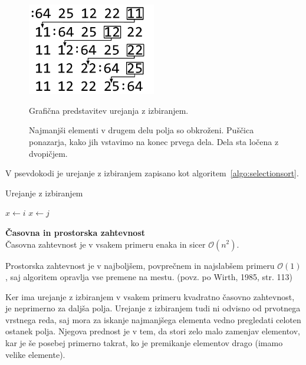 \documentclass[a4paper,oneside,12pt]{article}
\newcommand{\subsubsubsection}[1]{\vspace*{1ex}\textbf{#1}\\}
\begin{document}
\begin{figure}[ht]
    \begin{center}
        \includegraphics[height=40mm]{slike/selectionsort.pdf}
    \end{center}
    \vspace{-0.7cm}
    \caption[Urejanje z izbiranjem]{Grafična predstavitev urejanja z izbiranjem.}
    \caption*{{\small Najmanjši elementi v drugem delu polja so obkroženi. Puščica ponazarja, kako jih
    vstavimo na konec prvega dela. Dela sta ločena z dvopičjem.}}
    \label{fig:selectionsortimage}
\end{figure}

V psevdokodi je urejanje z izbiranjem zapisano kot algoritem~\ref{algo:selectionsort}.

\begin{algorithm}[h!t!]
  \caption{Urejanje z izbiranjem}\label{algo:selectionsort}
  \begin{algorithmic}[1]
            \State $x \gets i$
                    \State $x \gets j$
                \EndIf
            \EndFor
        \EndFor
    \EndFunction
  \end{algorithmic}
\end{algorithm}

\subsubsubsection{Časovna in prostorska zahtevnost} \nopagebreak
Časovna zahtevnost je v vsakem primeru enaka in sicer $\mathcal{O}(n^2)$.

Prostorska zahtevnost je v najboljšem, povprečnem in najslabšem primeru $\mathcal{O}(1)$, 
saj algoritem opravlja vse premene na mestu.
(povz. po Wirth, 1985, str. 113) 

Ker ima urejanje z izbiranjem v vsakem primeru kvadratno časovno zahtevnost, je neprimerno
za daljša polja. Urejanje z izbiranjem tudi ni odvisno od prvotnega vrstnega reda,
saj mora za iskanje najmanjšega elementa vedno pregledati celoten ostanek polja.
Njegova prednost je v tem, da stori zelo malo zamenjav elementov, kar je še posebej
primerno takrat, ko je premikanje elementov drago (imamo velike elemente).
\end{document}
